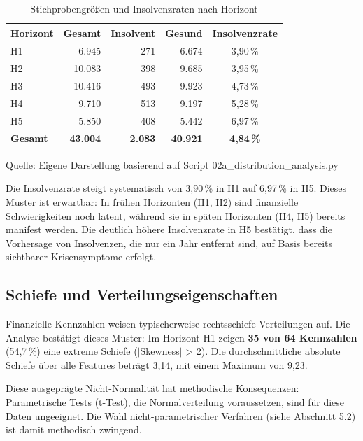 \begin{table}[htbp]
\centering
\caption{Stichprobengrößen und Insolvenzraten nach Horizont}
\label{tab:eda_sample_sizes}
\begin{tabular}{lrrrc}
\toprule
\textbf{Horizont} & \textbf{Gesamt} & \textbf{Insolvent} & \textbf{Gesund} & \textbf{Insolvenzrate} \\
\midrule
H1 & 6.945 & 271 & 6.674 & 3,90\,\% \\
H2 & 10.083 & 398 & 9.685 & 3,95\,\% \\
H3 & 10.416 & 493 & 9.923 & 4,73\,\% \\
H4 & 9.710 & 513 & 9.197 & 5,28\,\% \\
H5 & 5.850 & 408 & 5.442 & 6,97\,\% \\
\midrule
\textbf{Gesamt} & \textbf{43.004} & \textbf{2.083} & \textbf{40.921} & \textbf{4,84\,\%} \\
\bottomrule
\end{tabular}
\par\smallskip
{\footnotesize Quelle: Eigene Darstellung basierend auf Script 02a\_distribution\_analysis.py}
\end{table}

Die Insolvenzrate steigt systematisch von 3,90\,\% in H1 auf 6,97\,\% in H5. Dieses Muster ist erwartbar: In frühen Horizonten (H1, H2) sind finanzielle Schwierigkeiten noch latent, während sie in späten Horizonten (H4, H5) bereits manifest werden. Die deutlich höhere Insolvenzrate in H5 bestätigt, dass die Vorhersage von Insolvenzen, die nur ein Jahr entfernt sind, auf Basis bereits sichtbarer Krisensymptome erfolgt.

\subsection{Schiefe und Verteilungseigenschaften}

Finanzielle Kennzahlen weisen typischerweise rechtsschiefe Verteilungen auf. Die Analyse bestätigt dieses Muster: Im Horizont H1 zeigen \textbf{35 von 64 Kennzahlen} (54,7\,\%) eine extreme Schiefe ($|$Skewness$|$ > 2). Die durchschnittliche absolute Schiefe über alle Features beträgt 3,14, mit einem Maximum von 9,23.

    Diese ausgeprägte Nicht-Normalität hat methodische Konsequenzen: Parametrische Tests (t-Test), die Normalverteilung voraussetzen, sind für diese Daten ungeeignet. Die Wahl nicht-parametrischer Verfahren (siehe Abschnitt 5.2) ist damit methodisch zwingend.

